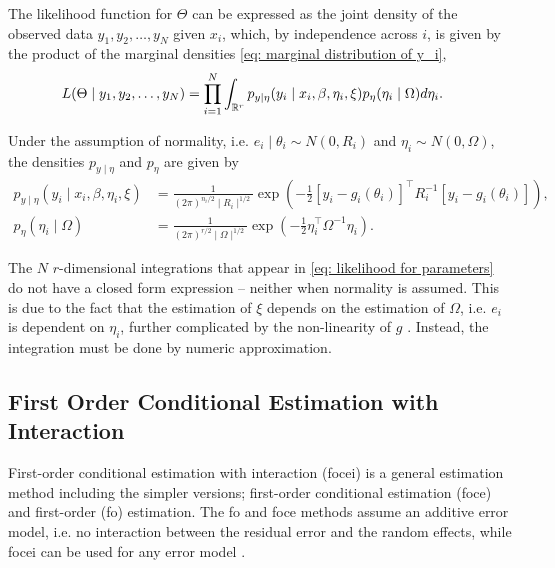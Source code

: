 The likelihood function for $\Theta$ can be expressed as the joint density of the observed data $y_1,y_2,\dots,y_N$ given $x_i$, which, by independence across $i$, is given by the product of the marginal densities \eqref{eq: marginal distribution of y_i},
\begin{align}
    L(\Theta\mid  y_1,y_2,\dots,y_N)&=\prod_{i=1}^N\int_{\mathbb{R}^r} p_{y\mid \eta}(y_i\mid x_i,\beta,\eta_i,\xi)p_\eta(\eta_i\mid  \Omega)d\eta_i.\label{eq: likelihood for parameters}
\end{align}

Under the assumption of normality, i.e. $e_i\mid \theta_i \sim N(0,R_i)$ and $\eta_i \sim N(0,\Omega)$, the densities $p_{y\mid \eta}$ and $p_{\eta}$ are given by
\begin{align*}
    p_{y\mid \eta}(y_i\mid x_i,\beta,\eta_i,\xi) &= \frac{1}{(2\pi)^{n_i/2}\mid R_i\mid ^{1/2}}\exp{\left(-\frac{1}{2}\left[y_i-g_i(\theta_i)\right]^\top R_i^{-1}\left[y_i-g_i(\theta_i)\right]\right)},\\
    p_\eta(\eta_i\mid \Omega)&=\frac{1}{(2\pi)^{r/2}\mid \Omega\mid ^{1/2}}\exp{\left(-\frac{1}{2}\eta_i^\top \Omega^{-1}\eta_i\right)}.
\end{align*}

The $N$ $r$-dimensional integrations that appear in \eqref{eq: likelihood for parameters} do not have a closed form expression -- neither when normality is assumed. This is due to the fact that the estimation of $\xi$ depends on the estimation of $\Omega$, i.e. $e_i$ is dependent on $\eta_i$, further complicated by the non-linearity of $g$ \citep[p. 254]{bonate}. Instead, the integration must be done by numeric approximation. 



\subsection{First Order Conditional Estimation with Interaction}
First-order conditional estimation with interaction (focei) is a general estimation method including the simpler versions; first-order conditional estimation (foce) and first-order (fo) estimation. The fo and foce methods assume an additive error model, i.e. no interaction between the residual error and the random effects, while focei can be used for any error model \citep{Bae2016}. 

